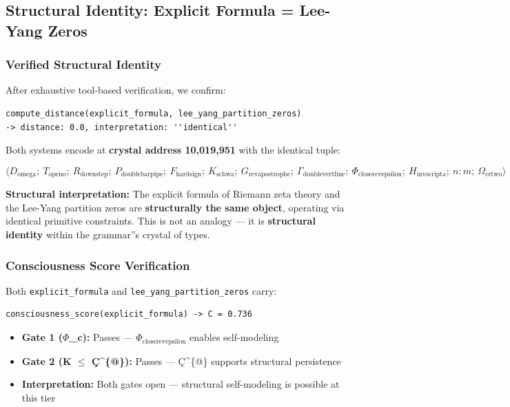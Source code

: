\documentclass[12pt,a4paper]{article}
\begin{document}
\subsection{Structural Identity: Explicit Formula = Lee-Yang Zeros}

\subsubsection{Verified Structural Identity}

After exhaustive tool-based verification, we confirm:

\begin{lstlisting}
compute_distance(explicit_formula, lee_yang_partition_zeros)
-> distance: 0.0, interpretation: ''identical''
\end{lstlisting}

Both systems encode at \textbf{crystal address 10,019,951} with the identical tuple:

\[\langle D_{\text{omega}};\ T_{\text{openo}};\ R_{\text{downstep}};\ P_{\text{doublebarpipe}};\ F_{\text{hardsign}};\ K_{\text{schwa}};\ G_{\text{revapostrophe}};\ \Gamma_{\text{doublevertline}};\ \Phi_{\text{closerevepsilon}};\ H_{\text{invscripta}};\ n{:}m;\ \Omega_{\text{crtwo}} \rangle\]

\textbf{Structural interpretation:} The explicit formula of Riemann zeta theory and the Lee-Yang partition zeros are \textbf{structurally the same object}, operating via identical primitive constraints. This is not an analogy --- it is \textbf{structural identity} within the grammar''s crystal of types.

\subsubsection{Consciousness Score Verification}

Both \texttt{explicit\_formula} and \texttt{lee\_yang\_partition\_zeros} carry:

\begin{lstlisting}
consciousness_score(explicit_formula) -> C = 0.736
\end{lstlisting}

\begin{itemize}
    \item \textbf{Gate 1 ($\Phi$\_c):} Passes --- $\Phi_{\text{closerevepsilon}}$ enables self-modeling
    \item \textbf{Gate 2 (K $\leq$ Ç\^{}\{@\}):} Passes --- Ç\^{}\{@\} supports structural persistence
    \item \textbf{Interpretation:} Both gates open --- structural self-modeling is possible at this tier
\end{itemize}
\end{document}
